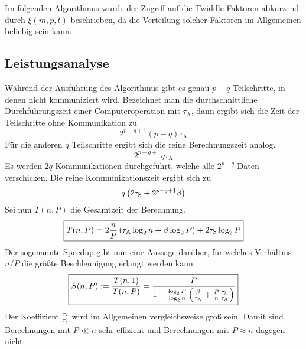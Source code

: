 			Im folgenden Algorithmus wurde der Zugriff auf die Twiddle-Faktoren abkürzend durch $\xi(m,p,t)$ beschrieben, da die Verteilung solcher Faktoren im Allgemeinen beliebig sein kann.

			\begin{tcolorbox}[colframe=black,colbacktitle=white,coltitle=black, attach boxed title to top center={yshift=-2mm},enhanced, titlerule=0.1pt, boxrule=0.5pt, arc=5pt,title=Listing:\quad paralleler FFT-Algorithmus]
				
			\end{tcolorbox}
		

		\subsection{Leistungsanalyse} %
		\label{sub:leistungsanalyse}
		
			Während der Ausführung des Algorithmus gibt es genau $p-q$ Teilschritte, in denen nicht kommuniziert wird.
			Bezeichnet man die durchschnittliche Durchführungszeit einer Computeroperation mit $\tau_\mathrm{A}$, dann ergibt sich die Zeit der Teilschritte ohne Kommunikation zu
			\[ 2^{p-q+1}(p-q)\tau_\mathrm{A} \]
			Für die anderen $q$ Teilschritte ergibt sich die reine Berechnungszeit analog.
			\[ 2^{p-q+1}q\tau_\mathrm{A} \]
			Es werden $2q$ Kommunikationen durchgeführt, welche alle $2^{p-q}$ Daten verschicken.
			Die reine Kommunikationszeit ergibt sich zu
			\[ q\left(  2\tau_\mathrm{S} + 2^{p-q+1}\beta  \right) \]
			Sei nun $T(n,P)$ die Gesamtzeit der Berechnung.
			\[ \boxed{ T(n,P) = 2\frac{n}{P}\left(  \tau_\mathrm{A}\log_2 n + \beta\log_2 P  \right) + 2\tau_\mathrm{S}\log_2 P } \]
			Der sogenannte Speedup gibt nun eine Aussage darüber, für welches Verhältnis $n/P$ die größte Beschleunigung erlangt werden kann.
			\[ \boxed{S(n,P):=\frac{T(n,1)}{T(n,P)} = \frac{P}{ 1 + \frac{\log_2 P}{\log_2 n}\left(  \frac{\beta}{\tau_\mathrm{A}} + \frac{P}{n}\frac{\tau_{\mathrm{S}}}{\tau_{\mathrm{A}}}  \right) }} \]
			Der Koeffizient $\frac{\tau_{\mathrm{S}}}{\tau_{\mathrm{A}}}$ wird im Allgemeinen vergleichsweise groß sein.
			Damit sind Berechnungen mit $P \ll n$ sehr effizient und Berechnungen mit $P\approx n$ dagegen nicht.



	\nocite{velde-csc}
	\nocite{hermann-nm}
	\nocite{wiki-cooley-ffta}
	\nocite{wiki-fft}
	\nocite{fftw-p}

	

